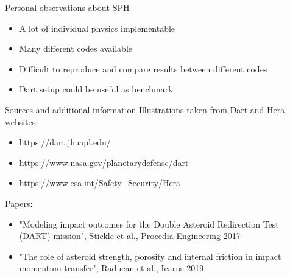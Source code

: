 \documentclass{beamer}
\begin{document}
\begin{frame}{Personal observations about SPH}
	\begin{itemize}
	\item A lot of individual physics implementable 
	\item Many different codes available 
	\item Difficult to reproduce and compare results between different codes
	\item Dart setup could be useful as benchmark 
	\end{itemize}
\end{frame}

\begin{frame}{Sources and additional information}
	Illustrations taken from Dart and Hera websites:
\begin{itemize}
	\item https://dart.jhuapl.edu/ 
	\item https://www.nasa.gov/planetarydefense/dart
	\item https://www.esa.int/Safety\_Security/Hera
\end{itemize} 
	Papers:
\begin{itemize}
	\item "Modeling impact outcomes for the Double Asteroid Redirection Test (DART) mission", Stickle et al., Procedia Engineering 2017
	\item "The role of asteroid strength, porosity and internal friction in impact momentum transfer", Raducan et al., Icarus 2019
\end{itemize} 
\end{frame}
\end{document}
